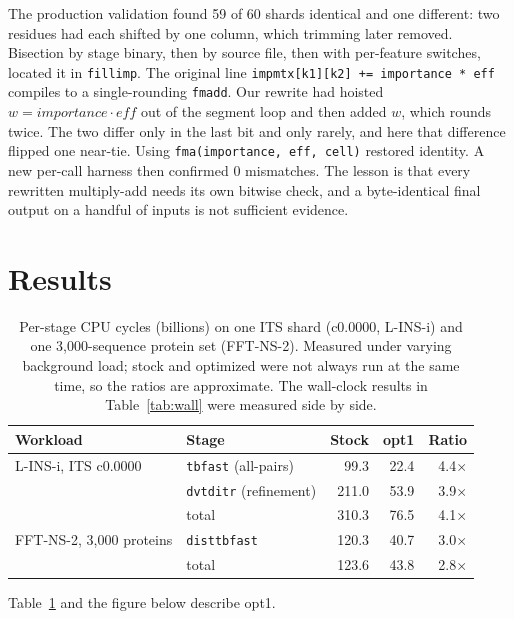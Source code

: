 \documentclass[11pt]{article}
\newcommand{\code}[1]{\texttt{#1}}
\begin{document}
The production validation found 59 of 60 shards identical and one different: two residues
had each shifted by one column, which trimming later removed. Bisection by stage binary,
then by source file, then with per-feature switches, located it in \code{fillimp}. The
original line \code{impmtx[k1][k2] += importance * eff} compiles to a single-rounding
\code{fmadd}. Our rewrite had hoisted $w = \mathit{importance}\cdot\mathit{eff}$ out of the
segment loop and then added $w$, which rounds twice. The two differ only in the last bit
and only rarely, and here that difference flipped one near-tie. Using
\code{fma(importance, eff, cell)} restored identity. A new per-call harness then confirmed
0 mismatches. The lesson is that every rewritten multiply-add needs its own bitwise check,
and a byte-identical final output on a handful of inputs is not sufficient evidence.

\section{Results}
\label{sec:results}

\begin{table}[h]
\centering
\caption{Per-stage CPU cycles (billions) on one ITS shard (c0.0000, L-INS-i) and one
3{,}000-sequence protein set (FFT-NS-2). Measured under varying background load; stock and
optimized were not always run at the same time, so the ratios are approximate. The wall-clock
results in Table~\ref{tab:wall} were measured side by side.}
\label{tab:cycles}
\begin{tabular}{llrrr}
\toprule
Workload & Stage & Stock & opt1 & Ratio \\
\midrule
L-INS-i, ITS c0.0000 & \code{tbfast} (all-pairs) & 99.3 & 22.4 & 4.4$\times$ \\
                     & \code{dvtditr} (refinement) & 211.0 & 53.9 & 3.9$\times$ \\
                     & total & 310.3 & 76.5 & 4.1$\times$ \\
\midrule
FFT-NS-2, 3{,}000 proteins & \code{disttbfast} & 120.3 & 40.7 & 3.0$\times$ \\
                           & total & 123.6 & 43.8 & 2.8$\times$ \\
\bottomrule
\end{tabular}
\end{table}

Table~\ref{tab:cycles} and the figure below describe opt1.
\end{document}
